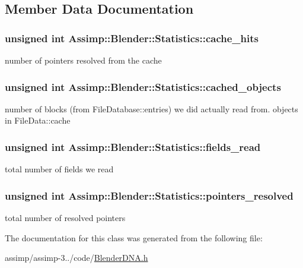 \subsection{Member Data Documentation}
\hypertarget{class_assimp_1_1_blender_1_1_statistics_a42c6bff1315c09f78d9b37b1961f53ca}{
\subsubsection[{cache\+\_\+hits}]{\setlength{\rightskip}{0pt plus 5cm}unsigned int Assimp\+::\+Blender\+::\+Statistics\+::cache\+\_\+hits}}\label{class_assimp_1_1_blender_1_1_statistics_a42c6bff1315c09f78d9b37b1961f53ca}
number of pointers resolved from the cache \hypertarget{class_assimp_1_1_blender_1_1_statistics_ad5ca6adbae251736d4119472fa9dd753}{
\subsubsection[{cached\+\_\+objects}]{\setlength{\rightskip}{0pt plus 5cm}unsigned int Assimp\+::\+Blender\+::\+Statistics\+::cached\+\_\+objects}}\label{class_assimp_1_1_blender_1_1_statistics_ad5ca6adbae251736d4119472fa9dd753}
number of blocks (from File\+Database\+::entries) we did actually read from. objects in File\+Data\+::cache \hypertarget{class_assimp_1_1_blender_1_1_statistics_adb96a19ae0a9b671d4056408b341dc65}{
\subsubsection[{fields\+\_\+read}]{\setlength{\rightskip}{0pt plus 5cm}unsigned int Assimp\+::\+Blender\+::\+Statistics\+::fields\+\_\+read}}\label{class_assimp_1_1_blender_1_1_statistics_adb96a19ae0a9b671d4056408b341dc65}
total number of fields we read \hypertarget{class_assimp_1_1_blender_1_1_statistics_a16740104345d502ccc24215eb8b3f5c7}{
\subsubsection[{pointers\+\_\+resolved}]{\setlength{\rightskip}{0pt plus 5cm}unsigned int Assimp\+::\+Blender\+::\+Statistics\+::pointers\+\_\+resolved}}\label{class_assimp_1_1_blender_1_1_statistics_a16740104345d502ccc24215eb8b3f5c7}
total number of resolved pointers 

The documentation for this class was generated from the following file\+:\begin{DoxyCompactItemize}
\item 
assimp/assimp-\/3../code/\hyperlink{_blender_d_n_a_8h}{Blender\+D\+N\+A.\+h}\end{DoxyCompactItemize}
